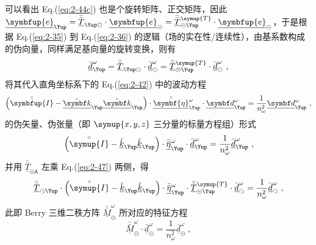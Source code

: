 可以看出 Eq.(\ref{eq:2-44c}) 也是个旋转矩阵、正交矩阵，因此 $\underline{\symbfup{e}}_{\Yup} = \bar{\bar{\underline{T}}}_{\Yup\circleddash} \cdot \underline{\symbfup{e}}_{\circleddash} = \bar{\bar{\underline{T}}}_{\circleddash\Yup}^{\symup{T}} \cdot \underline{\symbfup{e}}_{\circleddash}$，于是根据 Eq.(\ref{eq:2-35}) 到 Eq.(\ref{eq:2-36}) 的逻辑（场的实在性/连续性），由基系数构成的伪向量，同样满足基向量的旋转变换，则有 
\begin{equation} \label{eq:2-45}
	\bar{\underline{d}}^{\omega}_{\Yup} = \bar{\bar{\underline{T}}}_{\Yup\circleddash} \cdot \bar{\underline{d}}^{\omega}_{\circleddash} = \bar{\bar{\underline{T}}}_{\circleddash\Yup}^{\symup{T}} \cdot \bar{\underline{d}}^{\omega}_{\circleddash} ~,
\end{equation}
将其代入直角坐标系下的 Eq.(\ref{eq:2-42}) 中的波动方程
\begin{equation} \label{eq:2-46}
	\left( \bar{\bar{\symbfup{I}}} - \hat{\underline{\symbf k}}_{\Yup} \hat{\underline{\symbf k}}_{\Yup} \right) \cdot \bar{\bar{\underline{\symbf{\eta}}}}^{\omega}_{\Yup} \cdot \underline{\symbf d}^{\omega}_{\Yup} = \frac{ 1 }{ n^2_\omega } \underline{\symbf d}^{\omega}_{\Yup} ~,
\end{equation}
的伪矢量、伪张量（即 $\symup{x,y,z}$ 三分量的标量方程组）形式
\begin{equation} \label{eq:2-47}
	\left( \bar{\bar{\symup{I}}} - \hat{\underline{k}}_{\Yup} \hat{\underline{k}}_{\Yup} \right) \cdot \bar{\bar{\underline{\eta}}}^{\omega}_{\Yup} \cdot \bar{\underline{d}}^{\omega}_{\Yup} = \frac{ 1 }{ n^2_\omega } \bar{\underline{d}}^{\omega}_{\Yup} ~,
\end{equation}
并用 $\bar{\bar{\underline{T}}}_{\circleddash\Yup}$ 左乘 Eq.(\ref{eq:2-47}) 两侧，得
\begin{equation} \label{eq:2-48}
	\bar{\bar{\underline{T}}}_{\circleddash\Yup} \cdot \left( \bar{\bar{\symup{I}}} - \hat{\underline{k}}_{\Yup} \hat{\underline{k}}_{\Yup} \right) \cdot \bar{\bar{\underline{\eta}}}^{\omega}_{\Yup} \cdot \bar{\bar{\underline{T}}}_{\circleddash\Yup}^{\symup{T}} \cdot \bar{\underline{d}}^{\omega}_{\circleddash} = \frac{ 1 }{ n^2_\omega } \bar{\underline{d}}^{\omega}_{\circleddash} ~,
\end{equation}
此即 Berry 三维二秩方阵 $\bar{\bar{\underline{M}}}^{\omega}_{\circleddash}$ 所对应的特征方程
\begin{equation} \label{eq:2-49}
	\bar{\bar{\underline{M}}}^{\omega}_{\circleddash} \cdot \bar{\underline{d}}^{\omega}_{\circleddash} = \frac{ 1 }{ n^2_\omega } \bar{\underline{d}}^{\omega}_{\circleddash} ~,
\end{equation}
